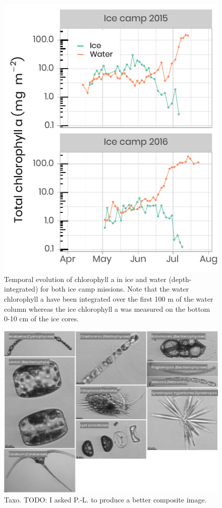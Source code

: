 \documentclass[12pt,a4paper]{scrartcl}
\begin{document}
\begin{figure}[h]
	\centering
	\includegraphics[scale = 2]{../../../graphs/fig9.pdf}
	\caption{Temporal evolution of chlorophyll a in ice and water (depth-integrated) for both ice camp missions. Note that the water chlorophyll a have been integrated over the first 100 m of the water column whereas the ice chlorophyll a was measured on the bottom 0-10 cm of the ice cores.}
\end{figure}

\clearpage
\newpage

\begin{figure}[h]
	\centering
	\includegraphics[scale = 1]{../../../graphs/fig10.png}
	\caption{Taxo. TODO: I asked P.-L. to produce a better composite image.}
\end{figure}
\end{document}
